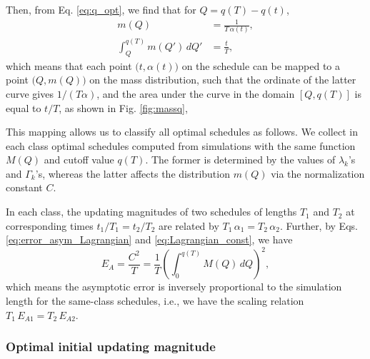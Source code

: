 \documentclass[reprint, floatfix]{revtex4-1}
\begin{document}
Then, from Eq. \eqref{eq:q_opt},
we find that for $Q = q(T) - q(t)$,
%
\begin{align}
  m(Q)
  &=
  \frac{ 1 }
       { T \, \alpha(t) }
  ,
\label{eq:mQ_invTa}
  \\
  \int_Q^{ q(T) }
    m(Q') \, dQ'
  &=
  \frac t T
  ,
\label{eq:intmQ_tT}
\end{align}
%
which means that each point
$\bigl(t, \alpha(t)\bigr)$
on the schedule can be mapped
to a point
$\bigl(Q, m(Q)\bigr)$
on the mass distribution,
such that the ordinate of the latter curve
gives $1/(T\alpha)$,
and the area under the curve in the domain $[Q, q(T)]$
is equal to $t/T$,
as shown in Fig. \ref{fig:massq},

This mapping allows us to classify all optimal schedules
as follows.
%
We collect in each class optimal schedules
computed from simulations with the same function $M(Q)$
and cutoff value $q(T)$.
%
The former is determined by the values of
$\lambda_k$'s and $\Gamma_k$'s,
whereas the latter affects the distribution $m(Q)$
via the normalization constant $C$.


In each class, the updating magnitudes of two schedules
of lengths $T_1$ and $T_2$
at corresponding times $t_1/T_1 = t_2/T_2$
are related by $T_1 \, \alpha_1 = T_2 \, \alpha_2$.
%
Further, by Eqs.
\eqref{eq:error_asym_Lagrangian}
and
\eqref{eq:Lagrangian_const},
we have
%
\begin{equation}
  E_A
  =
  \frac { C^2 } { T }
  =
  \frac 1 T
  \left(
    \int_0^{ q(T) } M(Q) \, dQ
  \right)^2
  ,
\label{eq:error_asym2}
\end{equation}
%
which means the asymptotic error
is inversely proportional to the simulation length
for the same-class schedules,
i.e., we have the scaling relation
$T_1 \, E_{A1} = T_2 \, E_{A2}$.





\subsubsection{\label{sec:optinitalpha}
  Optimal initial updating magnitude
}
\end{document}
